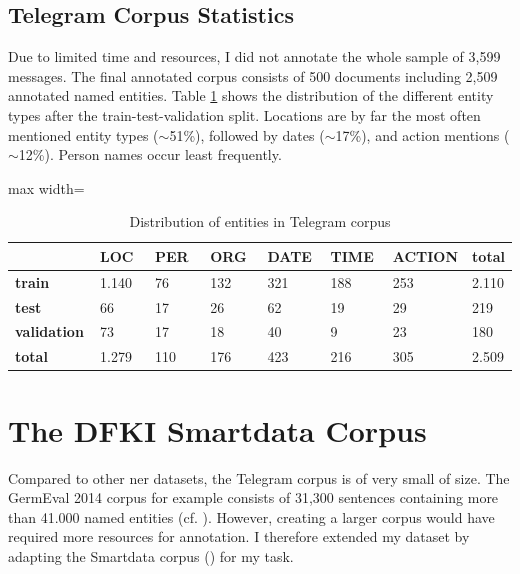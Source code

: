 \subsection{Telegram Corpus Statistics}
Due to limited time and resources, I did not annotate the whole sample of 3,599 messages. The final annotated corpus consists of 500 documents including 2,509 annotated named entities. 
Table \ref{tab:tg_corpus_stats} shows the distribution of the different entity types after the train-test-validation split. Locations are by far the most often mentioned entity types ($\sim$51\%), followed by dates ($\sim$17\%), and action mentions ($\sim$12\%). Person names occur least frequently. 

\begin{table}[h]
\caption{Distribution of entities in Telegram corpus}
\label{tab:tg_corpus_stats}
\centering
\begin{adjustbox}{max width=\textwidth}
\begin{tabular}{|p{0.18\linewidth}|p{0.15\linewidth}|p{0.15\linewidth}|p{0.15\linewidth}|p{0.15\linewidth}|p{0.15\linewidth}|p{0.15\linewidth}|p{0.15\linewidth}|}
\hline
& \textbf{LOC} & \textbf{PER} & \textbf{ORG} & \textbf{DATE} & \textbf{TIME} & \textbf{ACTION} & \textbf{total} \\ \hline 
\textbf{train} & 1.140 & 76 & 132 & 321 & 188 & 253 & 2.110 \\ \hline
\textbf{test} & 66 & 17 & 26 & 62 & 19 & 29 & 219\\ \hline
\textbf{validation} & 73 & 17 & 18 & 40 & 9 & 23 & 180\\ \hline
\textbf{total} & 1.279 & 110 & 176 & 423 & 216 & 305 & 2.509 \\ \hline
\end{tabular}
\end{adjustbox}
\end{table}

\section{The DFKI Smartdata Corpus}
Compared to other \gls{ner} datasets, the Telegram corpus is of very small of size. The GermEval 2014 corpus for example consists of 31,300 sentences containing more than 41.000 named entities (cf. \cite{benikova2014germeval}). 
However, creating a larger corpus would have required more resources for annotation. I therefore extended my dataset by adapting the Smartdata corpus (\cite{schiersch_2018}) for my task. 

